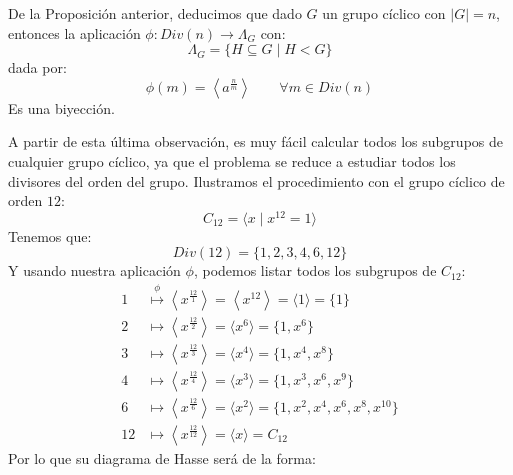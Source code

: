 \begin{observacion}
    De la Proposición anterior, deducimos que dado $G$ un grupo cíclico con $|G| = n$, entonces la aplicación $\phi:Div(n)\to \Lambda_G$ con:
    \begin{equation*}
        \Lambda_G = \{H \subseteq G \mid H < G\}
    \end{equation*}
    dada por:
    \begin{equation*}
        \phi(m) = \left\langle a^{\frac{n}{m}} \right\rangle \qquad \forall m\in Div(n)
    \end{equation*}
    Es una biyección.
\end{observacion}

\begin{ejemplo}
    A partir de esta última observación, es muy fácil calcular todos los subgrupos de cualquier grupo cíclico, ya que el problema se reduce a estudiar todos los divisores del orden del grupo. Ilustramos el procedimiento con el grupo cíclico de orden $12$:
    \begin{equation*}
        C_{12} = \langle x\mid x^{12} = 1 \rangle 
    \end{equation*}
    Tenemos que:
    \begin{equation*}
        Div(12) = \{1, 2, 3, 4, 6, 12\}
    \end{equation*}
    Y usando nuestra aplicación $\phi$, podemos listar todos los subgrupos de $C_{12}$:
    \begin{align*}
        1 &\stackrel{\phi}{\longmapsto} \left\langle x^{\frac{12}{1}} \right\rangle = \left\langle x^{12} \right\rangle  = \langle 1 \rangle  = \{1\} \\
        2 &\longmapsto \left\langle x^{\frac{12}{2}} \right\rangle = \langle x^{6} \rangle  = \{1, x^6\} \\
        3 &\longmapsto \left\langle x^{\frac{12}{3}} \right\rangle = \langle x^4 \rangle = \{1, x^4, x^8\} \\
        4 &\longmapsto \left\langle x^{\frac{12}{4}} \right\rangle  = \langle x^3 \rangle = \{1, x^3, x^6, x^9\} \\
        6 &\longmapsto \left\langle x^{\frac{12}{6}} \right\rangle = \langle x^2 \rangle = \{1, x^2, x^4, x^6, x^8, x^{10}\} \\
        12 &\longmapsto \left\langle x^{\frac{12}{12}} \right\rangle = \langle x \rangle  = C_{12}
    \end{align*}
    Por lo que su diagrama de Hasse será de la forma: 
    \begin{figure}[H]
        \centering
\end{figure}
\end{ejemplo}
